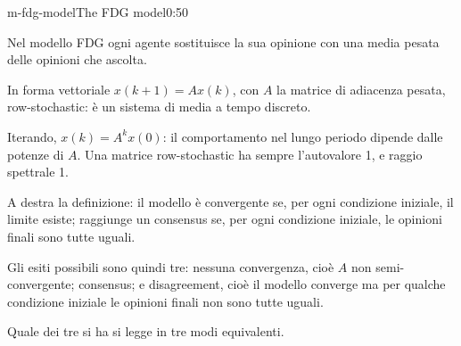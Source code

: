 \begin{slide}{m-fdg-model}{The FDG model}{0:50}
  \begin{discorso}
    \item Nel modello FDG ogni agente sostituisce la sua opinione con una media pesata delle opinioni che ascolta.
    \item In forma vettoriale $x(k+1)=Ax(k)$, con $A$ la matrice di adiacenza pesata, row-stochastic: è un sistema di media a tempo discreto.
    \item Iterando, $x(k)=A^kx(0)$: il comportamento nel lungo periodo dipende dalle potenze di $A$. Una matrice row-stochastic ha sempre l'autovalore 1, e raggio spettrale 1.
    \item {\color{red}} {\color{blue}A destra la definizione: il} modello è convergente se, per ogni condizione iniziale, il limite esiste; raggiunge un {\color{red}} {\color{blue}consensus} se, per ogni condizione iniziale, le opinioni finali sono tutte uguali.
    \item Gli esiti possibili sono quindi tre: nessuna convergenza, cioè $A$ non semi-convergente; {\color{red}} {\color{blue}consensus;} e {\color{red}} {\color{blue}disagreement,} cioè il modello converge ma per qualche condizione iniziale le opinioni finali non sono tutte uguali.
    \item Quale dei tre si ha si legge in tre modi equivalenti.
  \end{discorso}
\end{slide}

